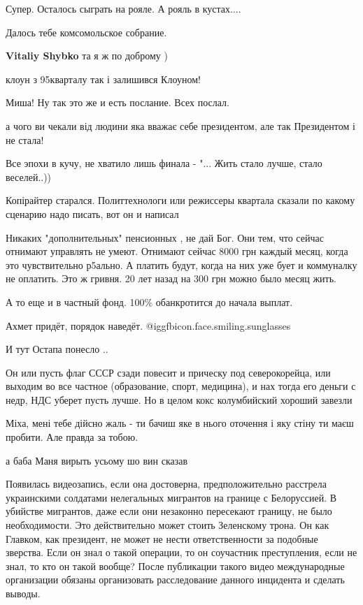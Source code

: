\begin{itemize}
Супер. Осталось сыграть на рояле. А рояль в кустах....

Далось тебе комсомольское собрание.


\textbf{Vitaliy Shybko} та я ж по доброму )

клоун з 95кварталу так і залишився Клоуном!

Миша! Ну так это же и есть послание. Всех послал.

а чого ви чекали від людини яка вважає себе президентом, але так Президентом і не стала!

Все эпохи в кучу, не хватило лишь финала - "... Жить стало лучше, стало веселей..))

Копірайтер старался. Политтехнологи или режиссеры квартала сказали по какому сценарию надо писать, вот он и написал


Никаких "дополнительных" пенсионных , не дай Бог. Они тем, что сейчас отнимают
управлять не умеют. Отнимают сейчас 8000 грн каждый месяц, когда это
чувствительно р5ально. А платить будут, когда на них уже бует и коммуналку не
оплатить. Это ж гривня. 20 лет назад на 300 грн можно было месяц жить.

А то еще и в частный фонд. 100\% обанкротится до начала выплат.


Ахмет придёт, порядок наведёт.  @igg{fbicon.face.smiling.sunglasses} 

И тут Остапа понесло ..


Он или пусть флаг СССР сзади повесит и прическу под северокорейца, или выходим
во все частное (образование, спорт, медицина), и нах тогда его деньги с недр,
НДС уберет пусть лучше. Но в целом кокс колумбийский хороший завезли


Міха, мені тебе дійсно жаль - ти бачиш яке в нього оточення і яку стіну ти маєш пробити. Але правда за тобою.

а баба Маня вирыть усьому шо вин сказав


Появилась видеозапись, если она достоверна, предположительно расстрела
украинскими солдатами нелегальных мигрантов на границе с Белоруссией. В
убийстве мигрантов, даже если они незаконно пересекают границу, не было
необходимости. Это действительно может стоить Зеленскому трона. Он как Главком,
как президент, не может не нести ответственности за подобные зверства. Если он
знал о такой операции, то он соучастник преступления, если не знал, то кто он
такой вообще? После публикации такого видео международные организации обязаны
организовать расследование данного инцидента и сделать выводы.

\end{itemize} %
